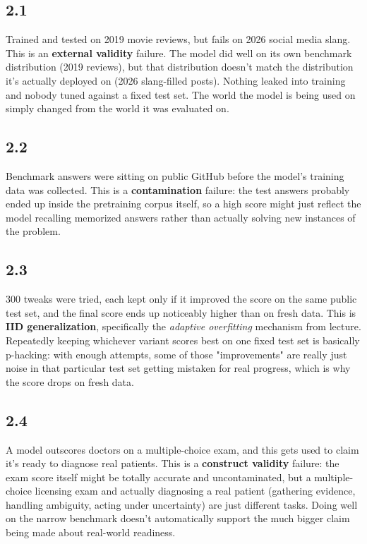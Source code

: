 \documentclass{article}
\begin{document}
\subsection*{2.1}
Trained and tested on 2019 movie reviews, but fails on 2026 social media slang. This is
an \textbf{external validity} failure. The model did well on its own
benchmark distribution (2019 reviews), but that distribution doesn't match the
distribution it's actually deployed on (2026 slang-filled posts). Nothing leaked into
training and nobody tuned against a fixed test set. The world the model is being used
on simply changed from the world it was evaluated on.

\subsection*{2.2}
Benchmark answers were sitting on public GitHub before the model's training data was
collected. This is a \textbf{contamination} failure: the test answers probably
ended up inside the pretraining corpus itself, so a high score might just reflect the
model recalling memorized answers rather than actually solving new instances of the
problem.

\subsection*{2.3}
300 tweaks were tried, each kept only if it improved the score on the same public test
set, and the final score ends up noticeably higher than on fresh data. This is
\textbf{IID generalization}, specifically the \textit{adaptive overfitting}
mechanism from lecture. Repeatedly keeping whichever variant scores best on one fixed
test set is basically p-hacking: with enough attempts, some of those "improvements"
are really just noise in that particular test set getting mistaken for real progress,
which is why the score drops on fresh data.

\subsection*{2.4}
A model outscores doctors on a multiple-choice exam, and this gets used to claim it's
ready to diagnose real patients. This is a \textbf{construct validity} failure:
the exam score itself might be totally accurate and uncontaminated, but a multiple-choice
licensing exam and actually diagnosing a real patient (gathering evidence, handling
ambiguity, acting under uncertainty) are just different tasks. Doing well on the narrow
benchmark doesn't automatically support the much bigger claim being made about real-world
readiness.
\end{document}
